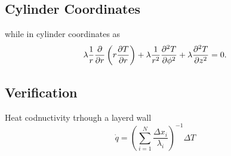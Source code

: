 \subsection{Cylinder Coordinates}
while in cylinder coordinates as
\begin{equation}
\label{eqn:homogeneous_heat_transfer_cylinder}
    \lambda\frac{1}{r}\pdv{}{r}\left(r \pdv{T}{r}\right) + \lambda\frac{1}{r^2}\pdv[2]{T}{\phi} + \lambda\pdv[2]{T}{z} = 0.
\end{equation}

\subsection{Verification}
Heat codnuctivity trhough a layerd wall
\begin{equation}
  \dot{q} = \left( \sum_{i = 1}^{N} \frac{\Delta x_i}{\lambda_i} \right)^{-1}\Delta T
\end{equation}
